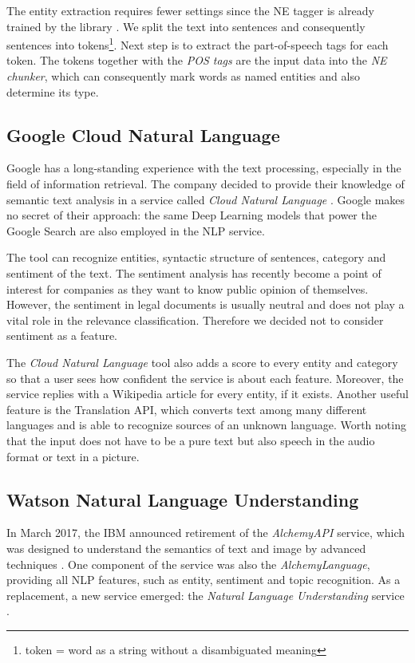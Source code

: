 \documentclass[
  digital, %
  notable,   %
  nolof,     %
  nolot,     %
]{fithesis3}
\begin{document}
The entity extraction requires fewer settings since the NE tagger is already trained by the library \cite[sec. 7.5]{bird2009natural}.
We split the text into sentences and consequently sentences into tokens\footnote{token = word as a string without a disambiguated meaning}.
Next step is to extract the part-of-speech tags for each token.
The tokens together with the \textit{POS tags} are the input data into the \textit{NE chunker}, which can consequently mark words as named entities and also determine its type.


\subsection{Google Cloud Natural Language}
Google has a long-standing experience with the text processing, especially in the field of information retrieval.
The company decided to provide their knowledge of semantic text analysis in a service called \textit{Cloud Natural Language} \cite{googleNLP}.
Google makes no secret of their approach: the same Deep Learning models that power the Google Search are also employed in the NLP service.

The tool can recognize entities, syntactic structure of sentences, category and sentiment of the text.
The sentiment analysis has recently become a point of interest for companies as they want to know public opinion of themselves.
However, the sentiment in legal documents is usually neutral and does not play a vital role in the relevance classification. Therefore we decided not to consider sentiment as a feature.

The \textit{Cloud Natural Language} tool also adds a score to every entity and category so that a user sees how confident the service is about each feature. Moreover, the service replies with a Wikipedia article for every entity, if it exists. Another useful feature is the Translation API, which converts text among many different languages and is able to recognize sources of an unknown language. Worth noting that the input does not have to be a pure text but also speech in the audio format or text in a picture.

\subsection{Watson Natural Language Understanding}
\label{sec:watson}
In March 2017, the IBM announced retirement of the \textit{AlchemyAPI} service, which was designed to understand the semantics of text and image by advanced techniques \cite{alchemyRetirement}.
One component of the service was also the \textit{AlchemyLanguage}, providing all NLP features, such as entity, sentiment and topic recognition.
As a replacement, a new service emerged: the \textit{Natural Language Understanding} service \cite{watsonNLP}.
\end{document}
